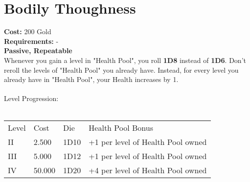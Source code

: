 \section{Bodily Thoughness}\label{sec:bodilythoughness}
\textbf{Cost:} 200 Gold\\
\textbf{Requirements:} -\\
\textbf{Passive, Repeatable}\\
Whenever you gain a level in "Health Pool", you roll \textbf{1D8} instead of \textbf{1D6}.
Don't reroll the levels of "Health Pool" you already have.
Instead, for every level you already have in "Health Pool", your Health increases by 1.\\
\\
Level Progression:\\
\\
\begin{tabular}{l | l | l | l}
    Level & Cost & Die & Health Pool Bonus\\
    II & 2.500 & 1D10 & +1 per level of Health Pool owned\\
    III & 5.000 & 1D12 & +1 per level of Health Pool owned\\
    IV & 50.000 & 1D20 & +4 per level of Health Pool owned\\
\end{tabular}